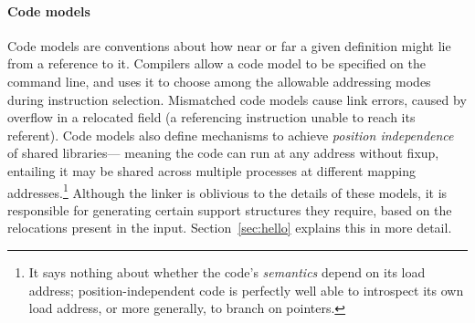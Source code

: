 \paragraph{Code models}\label{sec:code-models} Code models are conventions about 
how near or far a given definition might lie from a reference to it.
Compilers allow a code model to be specified on the command line, and uses it to choose among the allowable addressing modes during instruction selection.
Mismatched code models cause link errors, caused by overflow in a relocated field 
(a referencing instruction unable to reach its referent).
Code models also define mechanisms to achieve \emph{position independence} of shared libraries---
meaning the code can run at any address without fixup,
entailing it may be shared across multiple processes at different mapping addresses.\footnote{It says nothing about
whether the code's \emph{semantics} depend on its load address; 
position-independent code is perfectly well able to 
introspect its own load address, or more generally, to branch on pointers.}
Although the linker is oblivious to the details of these models, 
it is responsible for generating certain support structures they require,
based on the relocations present in the input.
Section~\ref{sec:hello} explains this in more detail.

